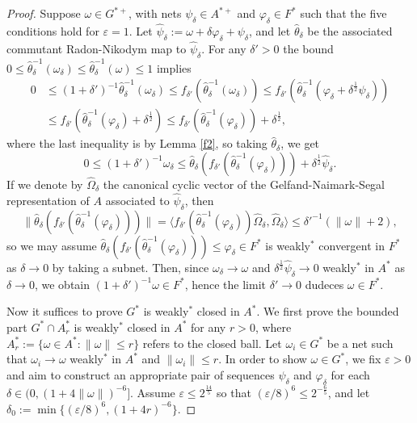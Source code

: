 \documentclass[noamsfonts,a4paper,10pt]{amsart}
\theoremstyle{plain}
\theoremstyle{definition}
\theoremstyle{remark}
\begin{document}
\begin{proof}
Suppose $\omega\in G^{*+}$, with nets $\psi_\delta\in A^{*+}$ and $\varphi_\delta\in F^*$ such that the five conditions hold for $\varepsilon=1$.
Let $\widehat\psi_\delta:=\omega+\delta\varphi_\delta+\psi_\delta$, and let $\widehat\theta_\delta$ be the associated commutant Radon-Nikodym map to $\widehat\psi_\delta$.
For any $\delta'>0$ the bound $0\le\widehat\theta_\delta^{-1}(\omega_\delta)\le\widehat\theta_\delta^{-1}(\omega)\le1$ implies
\begin{align*}
0&\le(1+\delta')^{-1}\widehat\theta_\delta^{-1}(\omega_\delta)
\le f_{\delta'}(\widehat\theta_\delta^{-1}(\omega_\delta))
\le f_{\delta'}(\widehat\theta_\delta^{-1}(\varphi_\delta+\delta^{\frac12}\psi_\delta))\\
&\le f_{\delta'}(\widehat\theta_\delta^{-1}(\varphi_\delta)+\delta^{\frac12})
\le f_{\delta'}(\widehat\theta_\delta^{-1}(\varphi_\delta))+\delta^{\frac12},
\end{align*}
where the last inequality is by Lemma \ref{f2}, so taking $\widehat\theta_\delta$, we get
\[0\le(1+\delta')^{-1}\omega_\delta\le\widehat\theta_\delta(f_{\delta'}(\widehat\theta_\delta^{-1}(\varphi_\delta)))+\delta^{\frac12}\widehat\psi_\delta.\]
If we denote by $\widehat\Omega_\delta$ the canonical cyclic vector of the Gelfand-Naimark-Segal representation of $A$ associated to $\widehat\psi_\delta$, then
\[\|\widehat\theta_\delta(f_{\delta'}(\widehat\theta_\delta^{-1}(\varphi_\delta)))\|
=\langle f_{\delta'}(\widehat\theta_\delta^{-1}(\varphi_\delta))\widehat\Omega_\delta,\widehat\Omega_\delta\rangle
\le\delta'^{-1}(\|\omega\|+2),\]
so we may assume $\widehat\theta_\delta(f_{\delta'}(\widehat\theta_\delta^{-1}(\varphi_\delta)))\le\varphi_\delta\in F^*$ is weakly$^*$ convergent in $F^*$ as $\delta\to0$ by taking a subnet.
Then, since $\omega_\delta\to\omega$ and $\delta^{\frac12}\widehat\psi_\delta\to0$ weakly$^*$ in $A^*$ as $\delta\to0$, we obtain $(1+\delta')^{-1}\omega\in F^*$, hence the limit $\delta'\to0$ dudeces $\omega\in F^*$.


Now it suffices to prove $G^*$ is weakly$^*$ closed in $A^*$.
We first prove the bounded part $G^*\cap A_r^*$ is weakly$^*$ closed in $A^*$ for any $r>0$, where $A_r^*:=\{\omega\in A^*:\|\omega\|\le r\}$ refers to the closed ball.
Let $\omega_i\in G^*$ be a net such that $\omega_i\to\omega$ weakly$^*$ in $A^*$ and $\|\omega_i\|\le r$.
In order to show $\omega\in G^*$, we fix $\varepsilon>0$ and aim to construct an appropriate pair of sequences $\psi_\delta$ and $\varphi_\delta$ for each $\delta\in(0,(1+4\|\omega\|)^{-6}]$.
Assume $\varepsilon\le2^{\frac{14}5}$ so that $(\varepsilon/8)^6\le2^{-\frac65}$, and let $\delta_0:=\min\{(\varepsilon/8)^6,(1+4r)^{-6}\}$.


\end{proof}
\end{document}
